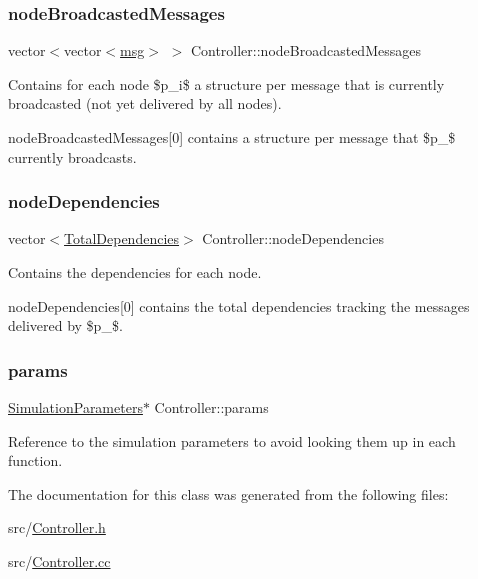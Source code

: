 \subsubsection{\texorpdfstring{node\+Broadcasted\+Messages}{nodeBroadcastedMessages}}
{\footnotesize\ttfamily vector$<$vector$<$\hyperlink{_controller_8h_afa0f3b802fbc219228f7bb97996fa558}{msg}$>$ $>$ Controller\+::node\+Broadcasted\+Messages\hspace{0.3cm}{\ttfamily [private]}}



Contains for each node \$p\+\_\+i\$ a structure per message that is currently broadcasted (not yet delivered by all nodes). 

node\+Broadcasted\+Messages\mbox{[}0\mbox{]} contains a structure per message that \$p\+\_\$ currently broadcasts. \mbox{\label{class_controller_ade3eeb8e78c5307d518e3b43967c4bac}} 
\subsubsection{\texorpdfstring{node\+Dependencies}{nodeDependencies}}
{\footnotesize\ttfamily vector$<$\hyperlink{class_total_dependencies}{Total\+Dependencies}$>$ Controller\+::node\+Dependencies\hspace{0.3cm}{\ttfamily [private]}}



Contains the dependencies for each node. 

node\+Dependencies\mbox{[}0\mbox{]} contains the total dependencies tracking the messages delivered by \$p\+\_\$. \mbox{\label{class_controller_a81d7fe43b78ef7601e6b36c3df38ce79}} 
\subsubsection{\texorpdfstring{params}{params}}
{\footnotesize\ttfamily \hyperlink{class_simulation_parameters}{Simulation\+Parameters}$\ast$ Controller\+::params\hspace{0.3cm}{\ttfamily [private]}}



Reference to the simulation parameters to avoid looking them up in each function. 



The documentation for this class was generated from the following files\+:\begin{DoxyCompactItemize}
\item 
src/\hyperlink{_controller_8h}{Controller.\+h}\item 
src/\hyperlink{_controller_8cc}{Controller.\+cc}\end{DoxyCompactItemize}
